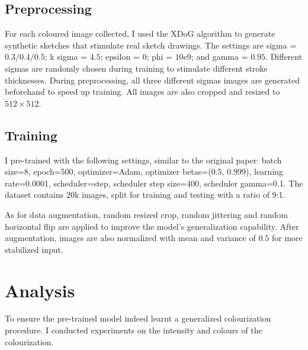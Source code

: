 \subsection{Preprocessing}
For each coloured image collected, I used the XDoG\cite{winnemollerXDoGEXtendedDifferenceofGaussians2012} algorithm to generate synthetic sketches that stimulate real sketch drawings. The settings are sigma = $0.3/0.4/0.5$; k sigma = $4.5$; epsilon = $0$; phi = $10\mathrm{e}9$; and gamma = $0.95$. Different sigmas are randomly chosen during training to stimulate different stroke thicknesses. During preprocessing, all three different sigmas images are generated beforehand to speed up training. All images are also cropped and resized to $512\times512$.

\subsection{Training}
I pre-trained with the following settings, similar to the original paper: batch size=8, epoch=500, optimizer=Adam, optimizer betas=(0.5, 0.999), learning rate=0.0001, scheduler=step, scheduler step size=400, scheduler gamma=0.1. The dataset contains 20k images, split for training and testing with a ratio of 9:1.

As for data augmentation, random resized crop, random jittering and random horizontal flip are applied to improve the model's generalization capability. After augmentation, images are also normalized with mean and variance of $0.5$ for more stabilized input.

\section{Analysis}
To ensure the pre-trained model indeed learnt a generalized colourization procedure. I conducted experiments on the intensity and colours of the colourization.

